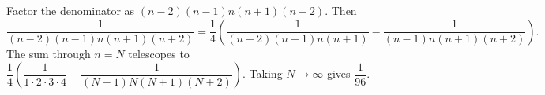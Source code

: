 Factor the denominator as $(n-2)(n-1)n(n+1)(n+2)$. Then
\[\dfrac{1}{(n-2)(n-1)n(n+1)(n+2)}=\dfrac{1}{4}\left(\dfrac{1}{(n-2)(n-1)n(n+1)}-\dfrac{1}{(n-1)n(n+1)(n+2)}\right).\]
The sum through $n=N$ telescopes to $\dfrac{1}{4}\left(\dfrac{1}{1\cdot2\cdot3\cdot4}-\dfrac{1}{(N-1)N(N+1)(N+2)}\right)$. Taking $N\to\infty$ gives $\boxed{\dfrac{1}{96}}$.

